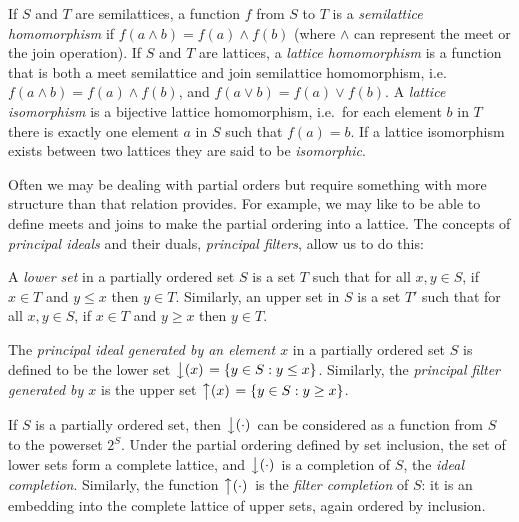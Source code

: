 \begin{defn}
If $S$ and $T$ are semilattices, a function $f$ from $S$ to $T$ is a \emph{semilattice homomorphism} if $f(a \land b) = f(a) \land f(b)$ (where $\land$ can represent the meet or the join operation). If $S$ and $T$ are lattices, a \emph{lattice homomorphism} is a function that is both a meet semilattice and join semilattice homomorphism, i.e.~$f(a \land b) = f(a) \land f(b)$, and $f(a \lor b) = f(a) \lor f(b)$. A \emph{lattice isomorphism} is a bijective lattice homomorphism, i.e.~for each element $b$ in $T$ there is exactly one element $a$ in $S$ such that $f(a) = b$. If a lattice isomorphism exists between two lattices they are said to be \emph{isomorphic}.
\end{defn}

Often we may be dealing with partial orders but require something with more structure than that relation provides. For example, we may like to be able to define meets and joins to make the partial ordering into a lattice. The concepts of \emph{principal ideals} and their duals, \emph{principal filters}, allow us to do this:

\begin{defn}
A \emph{lower set} in a partially ordered set $S$ is a set $T$ such that for all $x,y \in S$, if $x \in T$ and $y \le x$ then $y \in T$. Similarly, an upper set in $S$ is a set $T'$ such that for all $x,y \in S$, if $x\in T$ and $y \ge x$ then $y \in T$.

The \emph{principal ideal generated by an element $x$} in a partially ordered set $S$ is defined to be the lower set $\left\downarrow(x)\right. = \{y \in S : y \le x\}$. Similarly, the \emph{principal filter generated by $x$} is the upper set $\left\uparrow(x)\right. = \{y \in S : y \ge x\}$.
\end{defn}

\begin{prop}\label{ideal-completion-prop}
If $S$ is a partially ordered set, then $\left\downarrow(\cdot)\right.$ can be considered as a function from $S$ to the powerset $2^S$. Under the partial ordering defined by set inclusion, the set of lower sets form a complete lattice, and $\left\downarrow(\cdot)\right.$ is a completion of $S$, the \emph{ideal completion}. Similarly, the function $\left\uparrow(\cdot)\right.$ is the \emph{filter completion} of $S$: it is an embedding into the complete lattice of upper sets, again ordered by inclusion.
\end{prop}


